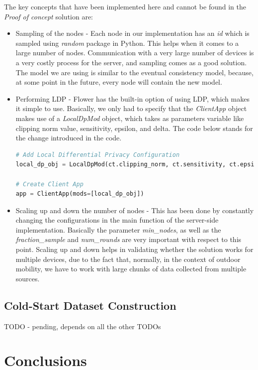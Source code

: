 \documentclass[conference]{IEEEtran}
\begin{document}
The key concepts that have been implemented here and cannot be found in the \textit{Proof of concept} solution are:
\begin{itemize}
  \item Sampling of the nodes - Each node in our implementation has an \textit{id} which is sampled using \textit{random} package in Python. This helps when it comes to a large number of nodes. Communication with a very large number of devices is a very costly process for the server, and sampling comes as a good solution. The model we are using is similar to the eventual consistency model, because, at some point in the future, every node will contain the new model.
  \item Performing LDP - Flower has the built-in option of using LDP, which makes it simple to use. Basically, we only had to specify that the \textit{ClientApp} object makes use of a \textit{LocalDpMod} object, which takes as parameters variable like clipping norm value, sensitivity, epsilon, and delta. The code below stands for the change introduced in the code.
  
\begin{lstlisting}[language=Python]
# Add Local Differential Privacy Configuration
local_dp_obj = LocalDpMod(ct.clipping_norm, ct.sensitivity, ct.epsilon, ct.delta)

# Create Client App
app = ClientApp(mods=[local_dp_obj])
\end{lstlisting}

  \item Scaling up and down the number of nodes - This has been done by constantly changing the configurations in the main function of the server-side implementation. Basically the parameter \textit{min\_nodes}, as well as the \textit{fraction\_sample} and \textit{num\_rounds} are very important with respect to this point. Scaling up and down helps in validating whether the solution works for multiple devices, due to the fact that, normally, in the context of outdoor mobility, we have to work with large chunks of data collected from multiple sources.
\end{itemize}

\subsection{Cold-Start Dataset Construction}

{\color{red}TODO - pending, depends on all the other TODOs}

\section{Conclusions}
\end{document}
